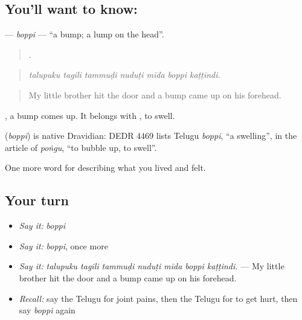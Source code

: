 \subsection*{You'll want to know: }
\textbf{} — \emph{boppi} — \textquotedblleft{}a bump; a lump on the head\textquotedblright{}.

\begin{quote}
      .
\end{quote}

\begin{quote}
\emph{talupuku tagili tammuḍi nuduṭi mīda boppi kaṭṭindi.}
\end{quote}

\begin{quote}
My little brother hit the door and a bump came up on his forehead.
\end{quote}

 , a bump comes up. It belongs with , to swell.

\begin{cousinweb}
\textbf{} (\emph{boppi}) is native Dravidian: DEDR 4469 lists Telugu \emph{boppi}, \textquotedblleft{}a swelling\textquotedblright{}, in the article of \emph{poṅgu}, \textquotedblleft{}to bubble up, to swell\textquotedblright{}.
\end{cousinweb}

\begin{grammarlens}[title={What you've built}]
One more word for describing what you lived and felt.
\end{grammarlens}

\subsection*{Your turn}
\begin{itemize}
\raggedright
  \item \emph{Say it:} \emph{boppi}
  \item \emph{Say it:} \emph{boppi}, once more
  \item \emph{Say it:} \emph{talupuku tagili tammuḍi nuduṭi mīda boppi kaṭṭindi.} — My little brother hit the door and a bump came up on his forehead.
  \item \emph{Recall:} say the Telugu for joint pains, then the Telugu for to get hurt, then say \emph{boppi} again
\end{itemize}

